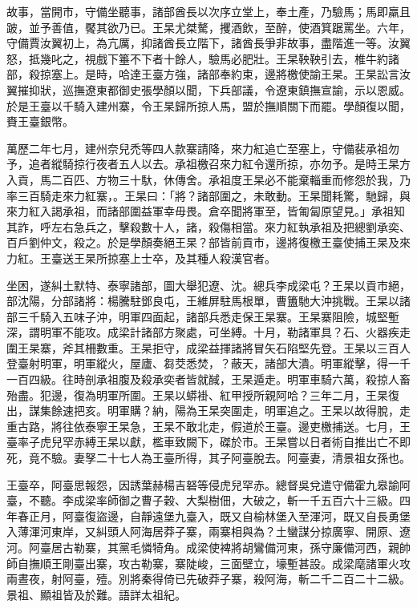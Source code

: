 \begin{pinyinscope}
故事，當開市，守備坐聽事，諸部酋長以次序立堂上，奉土產，乃驗馬；馬即羸且跛，並予善值，饜其欲乃已。王杲尤桀驁，攫酒飲，至醉，使酒箕踞罵坐。六年，守備賈汝翼初上，為亢厲，抑諸酋長立階下，諸酋長爭非故事，盡階進一等。汝翼怒，抵幾叱之，視戲下箠不下者十餘人，驗馬必肥壯。王杲鞅鞅引去，椎牛約諸部，殺掠塞上。是時，哈達王臺方強，諸部奉約束，邊將檄使諭王杲。王杲訟言汝翼摧抑狀，巡撫遼東都御史張學顏以聞，下兵部議，令遼東鎮撫宣諭，示以恩威。於是王臺以千騎入建州寨，令王杲歸所掠人馬，盟於撫順關下而罷。學顏復以聞，賚王臺銀幣。

萬歷二年七月，建州奈兒禿等四人款寨請降，來力紅追亡至塞上，守備裴承祖勿予，追者縱騎掠行夜者五人以去。承祖檄召來力紅令還所掠，亦勿予。是時王杲方入貢，馬二百匹、方物三十馱，休傳舍。承祖度王杲必不能棄輜重而修怨於我，乃率三百騎走來力紅寨，。王杲曰：「將？諸部圍之，未敢動。王杲聞耗驚，馳歸，與來力紅入謁承祖，而諸部圍益軍幸毋畏。倉卒聞將軍至，皆匍匐原望見。」承祖知其詐，呼左右急兵之，擊殺數十人，諸，殺傷相當。來力紅執承祖及把總劉承奕、百戶劉仲文，殺之。於是學顏奏絕王杲？部皆前貢市，邊將復檄王臺使捕王杲及來力紅。王臺送王杲所掠塞上士卒，及其種人殺漢官者。

坐困，遂糾土默特、泰寧諸部，圖大舉犯遼、沈。總兵李成梁屯？王杲以貢市絕，部沈陽，分部諸將：楊騰駐鄧良屯，王維屏駐馬根單，曹簠馳大沖挑戰。王杲以諸部三千騎入五味子沖，明軍四面起，諸部兵悉走保王杲寨。王杲寨阻險，城堅塹深，謂明軍不能攻。成梁計諸部方聚處，可坐縛。十月，勒諸軍具？石、火器疾走圍王杲寨，斧其柵數重。王杲拒守，成梁益揮諸將冒矢石陷堅先登。王杲以三百人登臺射明軍，明軍縱火，屋廬、芻茭悉焚，？蔽天，諸部大潰。明軍縱擊，得一千一百四級。往時剖承祖腹及殺承奕者皆就馘，王杲遁走。明軍車騎六萬，殺掠人畜殆盡。犯邊，復為明軍所圍。王杲以蟒褂、紅甲授所親阿哈？三年二月，王杲復出，謀集餘速把亥。明軍購？納，陽為王杲突圍走，明軍追之。王杲以故得脫，走重古路，將往依泰寧王杲急，王杲不敢北走，假道於王臺。邊吏檄捕送。七月，王臺率子虎兒罕赤縛王杲以獻，檻車致闕下，磔於市。王杲嘗以日者術自推出亡不即死，竟不驗。妻孥二十七人為王臺所得，其子阿臺脫去。阿臺妻，清景祖女孫也。

王臺卒，阿臺思報怨，因誘葉赫楊吉砮等侵虎兒罕赤。總督吳兌遣守備霍九皋諭阿臺，不聽。李成梁率師御之曹子穀、大梨樹佃，大破之，斬一千五百六十三級。四年春正月，阿臺復盜邊，自靜遠堡九臺入，既又自榆林堡入至渾河，既又自長勇堡入薄渾河東岸，又糾頭人阿海居莽子寨，兩寨相與為？土蠻謀分掠廣寧、開原、遼河。阿臺居古勒寨，其黨毛憐犄角。成梁使裨將胡鸞備河東，孫守廉備河西，親帥師自撫順王剛臺出寨，攻古勒寨，寨陡峻，三面壁立，壕塹甚設。成梁麾諸軍火攻兩晝夜，射阿臺，殪。別將秦得倚已先破莽子寨，殺阿海，斬二千二百二十二級。景祖、顯祖皆及於難。語詳太祖紀。


\end{pinyinscope}
